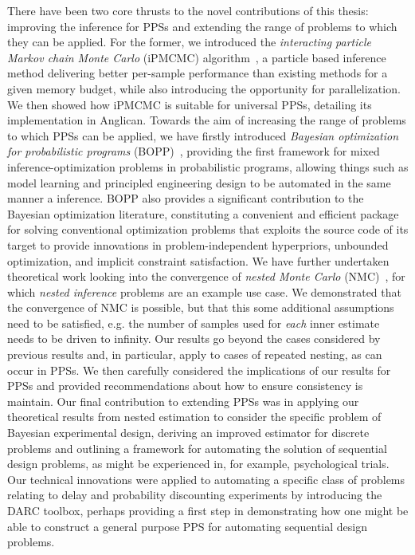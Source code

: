 There have been two core thrusts to the novel contributions of this thesis: improving the inference
for PPSs and extending the range of problems to which they can be applied.  For
the former, we introduced the \emph{interacting particle Markov chain Monte Carlo} (iPMCMC)
algorithm~\citep{rainforth2016interacting}, a particle based inference method delivering
better per-sample performance than existing methods for a given memory budget, while also introducing the opportunity for
parallelization.  We then showed how iPMCMC is suitable for universal PPSs, detailing its implementation
in Anglican.  Towards the aim of increasing the range of problems to which PPSs can be applied, 
we have firstly introduced \emph{Bayesian optimization for probabilistic 
	programs} (BOPP)~\citep{rainforth2016bayesian}, providing
the first framework for mixed inference-optimization problems in probabilistic programs, allowing things
such as model learning and principled engineering design to be automated in the same manner a inference.
BOPP also provides a significant contribution to the Bayesian optimization literature, constituting a
convenient and efficient package for solving conventional optimization problems that exploits the
source code of its target to provide innovations in problem-independent hyperpriors, unbounded
 optimization, and implicit constraint satisfaction.
We have further undertaken theoretical work looking into the convergence of \emph{nested Monte Carlo} (NMC)~\citep{rainforth2017pitfalls}, for which \emph{nested inference} problems are an
example use case.   We demonstrated that the convergence
of NMC is possible, but that this some additional assumptions need
to be satisfied, e.g. the number of samples used for \emph{each} inner estimate needs to be driven
to infinity.  Our results go beyond the cases considered
by previous results and, in particular, apply to cases of repeated nesting, as can occur in PPSs.
We then carefully considered the implications of our results for PPSs and provided recommendations
about how to ensure consistency is maintain.  Our final contribution to extending PPSs was in
applying our theoretical results from nested estimation to consider the specific problem of Bayesian
experimental design, deriving an improved estimator for discrete problems and outlining a framework
for automating the solution of sequential design problems, as might be experienced in, for example,
psychological trials.  Our technical innovations were applied to automating
a specific class of problems relating to delay and probability discounting experiments by
introducing the DARC toolbox, perhaps providing a first step in demonstrating how one might
be able to construct a general purpose PPS for automating sequential design problems.

